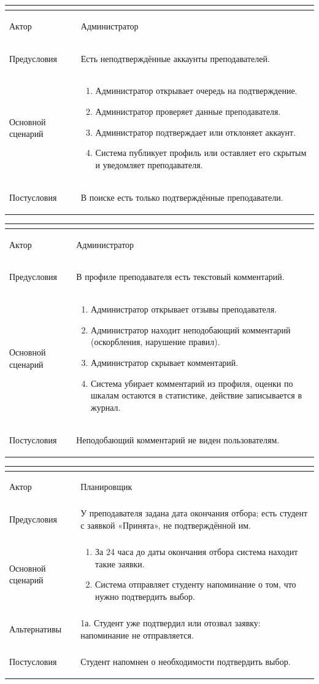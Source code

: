 \documentclass[a4paper,12pt]{article}
\newenvironment{ucd}[3]{%
  \needspace{10\baselineskip}
  \begin{longtable}{|>{\bfseries\raggedright\arraybackslash}p{3.0cm}|p{11.8cm}|}
  \hline
  \multicolumn{2}{|l|}{\textbf{#1.\ #2}}\\ \hline
  Актор & #3\\ \hline
}{\end{longtable}}
\newcommand{\steps}[1]{\begin{enumerate}[nosep,leftmargin=*]#1\end{enumerate}}
\begin{document}
\begin{ucd}{UC-26}{Подтвердить или отклонить аккаунт преподавателя}{Администратор}
Предусловия & Есть неподтверждённые аккаунты преподавателей.\\ \hline
Основной сценарий & \steps{
 \item Администратор открывает очередь на подтверждение.
 \item Администратор проверяет данные преподавателя.
 \item Администратор подтверждает или отклоняет аккаунт.
 \item Система публикует профиль или оставляет его скрытым и уведомляет преподавателя.}\\ \hline
Постусловия & В поиске есть только подтверждённые преподаватели.\\ \hline
\end{ucd}

\begin{ucd}{UC-27}{Скрыть неподобающий комментарий в отзыве}{Администратор}
Предусловия & В профиле преподавателя есть текстовый комментарий.\\ \hline
Основной сценарий & \steps{
 \item Администратор открывает отзывы преподавателя.
 \item Администратор находит неподобающий комментарий (оскорбления, нарушение правил).
 \item Администратор скрывает комментарий.
 \item Система убирает комментарий из профиля, оценки по шкалам остаются в статистике, действие записывается в журнал.}\\ \hline
Постусловия & Неподобающий комментарий не виден пользователям.\\ \hline
\end{ucd}

\begin{ucd}{UC-28}{Напомнить студенту о подтверждении до окончания отбора}{Планировщик}
Предусловия & У преподавателя задана дата окончания отбора; есть студент с заявкой «Принята», не подтверждённой им.\\ \hline
Основной сценарий & \steps{
 \item За 24 часа до даты окончания отбора система находит такие заявки.
 \item Система отправляет студенту напоминание о том, что нужно подтвердить выбор.}\\ \hline
Альтернативы & 1а. Студент уже подтвердил или отозвал заявку: напоминание не отправляется.\\ \hline
Постусловия & Студент напомнен о необходимости подтвердить выбор.\\ \hline
\end{ucd}
\end{document}
